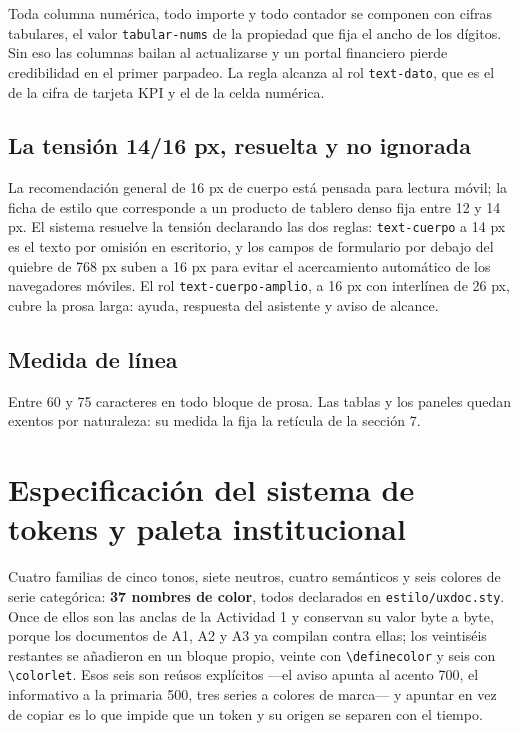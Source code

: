 Toda columna numérica, todo importe y todo contador se componen con cifras tabulares, el valor \texttt{tabular-nums} de la propiedad que fija el ancho de los dígitos. Sin eso las columnas bailan al actualizarse y un portal financiero pierde credibilidad en el primer parpadeo. La regla alcanza al rol \texttt{text-dato}, que es el de la cifra de tarjeta KPI y el de la celda numérica.

\subsection{La tensión 14/16 px, resuelta y no ignorada}

La recomendación general de 16 px de cuerpo está pensada para lectura móvil; la ficha de estilo que corresponde a un producto de tablero denso fija entre 12 y 14 px. El sistema resuelve la tensión declarando las dos reglas: \texttt{text-cuerpo} a 14 px es el texto por omisión en escritorio, y los campos de formulario por debajo del quiebre de 768 px suben a 16 px para evitar el acercamiento automático de los navegadores móviles. El rol \texttt{text-cuerpo-amplio}, a 16 px con interlínea de 26 px, cubre la prosa larga: ayuda, respuesta del asistente y aviso de alcance.

\subsection{Medida de línea}

Entre 60 y 75 caracteres en todo bloque de prosa. Las tablas y los paneles quedan exentos por naturaleza: su medida la fija la retícula de la sección 7.

\section{Especificación del sistema de tokens y paleta institucional}

Cuatro familias de cinco tonos, siete neutros, cuatro semánticos y seis colores de serie categórica: \textbf{37 nombres de color}, todos declarados en \texttt{estilo/uxdoc.sty}. Once de ellos son las anclas de la Actividad 1 y conservan su valor byte a byte, porque los documentos de A1, A2 y A3 ya compilan contra ellas; los veintiséis restantes se añadieron en un bloque propio, veinte con \texttt{\textbackslash definecolor} y seis con \texttt{\textbackslash colorlet}. Esos seis son reúsos explícitos ---el aviso apunta al acento 700, el informativo a la primaria 500, tres series a colores de marca--- y apuntar en vez de copiar es lo que impide que un token y su origen se separen con el tiempo.

